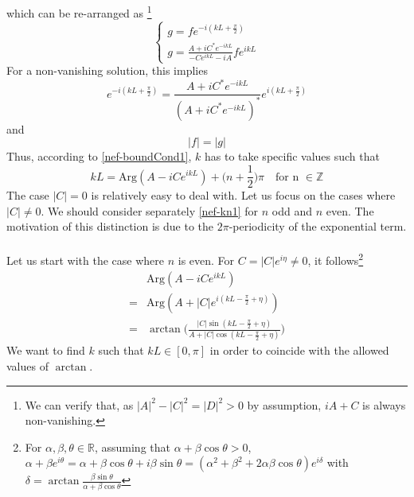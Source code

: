 which can be re-arranged as
\footnote{We can verify that, as $|A|^2 - |C|^2 = |D|^2 > 0$ by assumption, $iA + C$ is always non-vanishing.} 
\begin{equation}\label{nef-boundCond}
\begin{cases}
g = f e^{-i(kL+ \frac{\pi}{2})}  \\
g = \frac{A + iC^* e^{-ikL}}{- C e^{ikL} - iA} f e^{ikL}
\end{cases}
\end{equation}
For a non-vanishing solution, this implies
\begin{equation}\label{nef-boundCond1}
e^{-i(kL + \frac{\pi}{2})} = \frac{A + iC^* e^{-ikL}}{(A + iC^* e^{-ikL})^*} e^{i(kL + \frac{\pi}{2})}
\end{equation}
and 
\begin{equation}\label{nef-boundCond2}
| f | = | g |
\end{equation}
Thus, according to \cref{nef-boundCond1}, $k$ has to take specific values such that
\begin{equation}\label{nef-kn1}
kL =  \textrm{Arg}(A - iC e^{ikL}) + \big(n+\frac{1}{2} \big)\pi   \quad \textrm{for n $\in \mathbb{Z}$}
\end{equation}
The case $|C| =0$ is relatively easy to deal with. Let us focus on the cases where $|C| \neq 0$. We should consider separately \cref{nef-kn1} for $n$ odd and $n$ even. 
The motivation of this distinction is due to the $2\pi$-periodicity of the exponential term. \\\\
Let us start with the case where $n$ is even. 
For $C = |C| e^{i\eta} \neq 0 $, it follows\footnote{
For $\alpha, \beta, \theta \in \mathbb{R}$, assuming that $\alpha + \beta \cos \theta > 0$, $\alpha + \beta e^{i \theta} = \alpha + \beta \cos \theta + i\beta \sin \theta = (\alpha^2 + \beta^2 + 2\alpha \beta \cos \theta) e^{i \delta}$ with $\delta = \arctan \frac{\beta\sin\theta}{\alpha + \beta\cos\theta}$  
} 
\begin{equation}
\begin{split}
&\textrm{Arg}(A - iC e^{ikL}) \\
= &\textrm{Arg}(A + |C| e^{i(kL - \frac{\pi}{2} + \eta)}) \\
= & \arctan \bigg( \frac{|C| \sin(kL - \frac{\pi}{2} + \eta)}{A + | C| \cos(kL - \frac{\pi}{2} + \eta) }\bigg)
\end{split}
\end{equation}
We want to find $k$ such that $kL \in [0, \pi]$ in order to coincide with the allowed values of $\arctan$.
